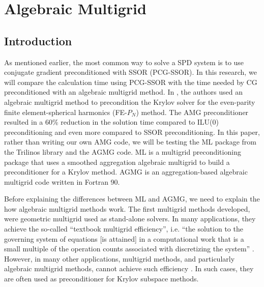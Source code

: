 \section{Algebraic Multigrid} \label{sec_amg}
\subsection{Introduction}
As mentioned earlier, the most common way to solve a SPD system is to use
conjugate gradient preconditioned with SSOR (PCG-SSOR). In this research, we
will compare the calculation time using PCG-SSOR with the time needed by CG 
preconditioned with an algebraic multigrid method. In \cite{amg_pn}, the authors 
used an algebraic multigrid method to precondition the Krylov solver for the 
even-parity finite element-spherical harmonics (FE-$P_N$) method. The AMG 
preconditioner resulted in a 60\% reduction in the solution time compared to 
ILU(0) preconditioning and even more compared to SSOR preconditioning. In this
paper, rather than writing our own AMG code, we will be testing the ML package 
\cite{ml_guide} from the Trilinos library and the AGMG code\cite{agmg_guide}. 
ML is a multigrid preconditioning package that uses a smoothed aggregation 
algebraic multigrid to build a preconditioner for a Krylov method. AGMG is an 
aggregation-based algebraic multigrid code written in Fortran 90.

Before explaining the differences between ML and AGMG, we need to explain the
how algebraic multigrid methods work. The first multigrid methods
developed, were geometric multigrid used as stand-alone solvers. In many 
applications, they achieve the so-called ``textbook multigrid
efficiency'', i.e. ``the solution to the governing system of equations [is
attained] in a computational work that is a small multiple of the operation
counts associated with discretizing the system'' \cite{textbook_eff}. However, 
in many other applications, multigrid methods, and particularly algebraic 
multigrid methods, cannot achieve such efficiency \cite{k_cycle}. In
such cases, they are often used as preconditioner for Krylov subspace methods. 

